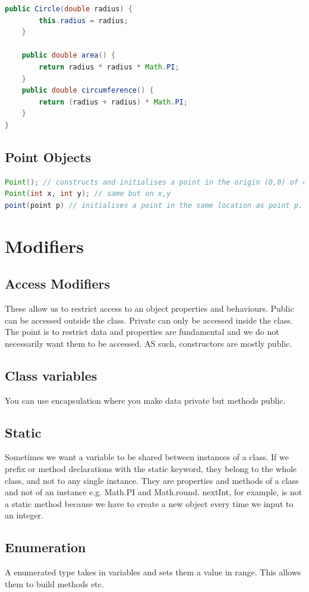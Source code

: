 \documentclass[11pt,a4 paper]{book}
\theoremstyle{plain}
\theoremstyle{definition}
\theoremstyle{remark}
\begin{document}
\begin{flushleft}
\begin{lstlisting}[language = Java]
	public Circle(double radius) {
		this.radius = radius;
	}

	public double area() {
		return radius * radius * Math.PI;
	}
	public double circumference() {
		return (radius + radius) * Math.PI;
	}
}
\end{lstlisting}
\subsection{Point Objects}
\begin{lstlisting}[language = Java]
Point(); // constructs and initialises a point in the origin (0,0) of cospace.
Point(int x, int y); // same but on x,y
point(point p) // initialises a point in the same location as point p.
\end{lstlisting}
\section{Modifiers}
\subsection{Access Modifiers}
These allow us to restrict access to an object properties and behaviours. Public can be accessed outside the class. Private can only be accessed inside the class. The point is to restrict data and properties are fundamental and we do not necessarily want them to be accessed. AS such, constructors are mostly public. 
\subsection{Class variables}
You can use encapsulation where you make data private but methods public.
\subsection{Static}
Sometimes we want a variable to be shared between instances of a class. If we prefix or method declarations with the static keyword, they belong to the whole class, and not to any single instance. They are properties and methods of a class and not of an instance e.g. Math.PI and Math.round. nextInt, for example, is not a static method because we have to create a new object every time we input to an integer.
\subsection{Enumeration}
A enumerated type takes in variables and sets them a value in range. This allows them to build methods etc.

\end{flushleft}
\end{document}
